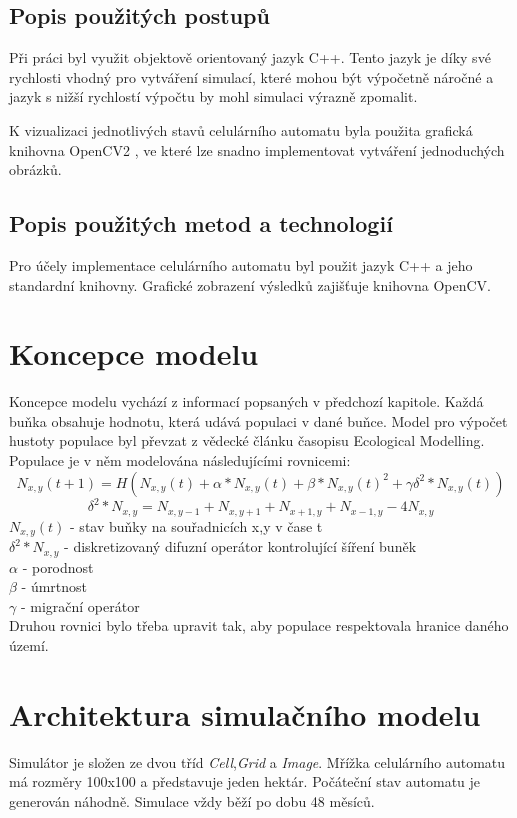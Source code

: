 \documentclass[a4paper,11pt]{article}
\begin{document}
\subsection{Popis použitých postupů}
Při práci byl využit objektově orientovaný jazyk C++. Tento jazyk je díky své rychlosti vhodný pro vytváření simulací, které mohou být výpočetně náročné a jazyk s nižší rychlostí výpočtu by mohl simulaci výrazně zpomalit. 

K vizualizaci jednotlivých stavů celulárního automatu byla použita grafická knihovna OpenCV2 \cite{opencv2}, ve které lze snadno implementovat vytváření jednoduchých obrázků. 

\subsection{Popis použitých metod a technologií}
Pro účely implementace celulárního automatu byl použit jazyk C++ a jeho standardní knihovny. Grafické zobrazení výsledků zajišťuje knihovna OpenCV.

\section{Koncepce modelu}
Koncepce modelu vychází z informací popsaných v předchozí kapitole. Každá buňka obsahuje hodnotu, která udává populaci v dané buňce. Model pro výpočet hustoty populace byl převzat z vědecké článku \cite{OurCA} časopisu Ecological Modelling. Populace je v něm modelována následujícími rovnicemi:
\begin{equation}
N_{x,y}(t+1) = H(N_{x,y}(t) + \alpha*N_{x,y}(t) + \beta*N_{x,y}(t)^2 + \gamma\delta^2*N_{x,y}(t))
\end{equation}
\begin{equation}
\delta^2*N_{x,y} = N_{x,y-1} + N_{x,y+1} + N_{x+1,y} + N_{x-1,y} - 4N_{x,y}
\end{equation}
\( N_{x,y}(t) \) - stav buňky na souřadnicích x,y v čase t\ \\
\( \delta^2*N_{x,y} \) - diskretizovaný difuzní operátor kontrolující šíření buněk \\
\( \alpha \) - porodnost \\
\( \beta \) - úmrtnost \\
\( \gamma \) - migrační operátor\\
Druhou rovnici bylo třeba upravit tak, aby populace respektovala hranice daného území.
\section{Architektura simulačního modelu}
Simulátor je složen ze dvou tříd \emph{Cell},\emph{Grid} a \emph{Image}. Mřížka celulárního automatu má rozměry 100x100 a představuje jeden hektár. Počáteční stav automatu je generován náhodně. Simulace vždy běží po dobu 48 měsíců.
\end{document}
